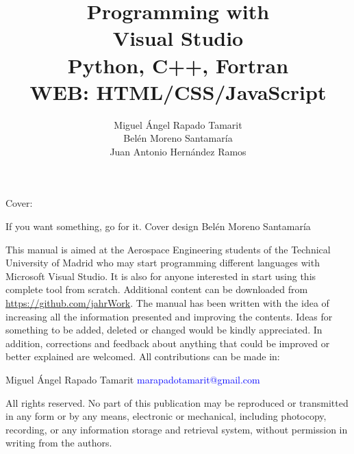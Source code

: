 \documentclass[a4paper,11pt,twoside,english]{book}
\title{{\fontsize{28}{34}\selectfont Programming with \\ \vspace{0.4cm} Visual Studio \\ \vspace{0.8cm} }  {\fontsize{28}{34}\selectfont Python, C++, Fortran\\ \vspace{0.4cm}WEB: HTML/CSS/JavaScript }}
\author{Miguel \'Angel Rapado Tamarit\\
		    Bel\'en Moreno Santamar\'ia \\
		    Juan Antonio Hern\'andez Ramos\\ 	
            \vspace{5cm} } %
\date{  } %
\begin{document}
 
  
  
  
   
    \maketitle
    \thispagestyle{empty}   %
    
    
    \noindent  Cover: 
    
    \noindent If you want something, go for it. Cover design Belén Moreno Santamaría
   
 
    \vfill  
    \begin{minipage}[b]{0.9\textwidth}
        This manual is aimed at the Aerospace Engineering students of the Technical University of Madrid who may start programming different languages with Microsoft Visual Studio. It is also for anyone interested in start using this complete tool from scratch. Additional content can be downloaded from \url{https://github.com/jahrWork}. The manual has been written with the idea of increasing all the information presented and improving the contents. Ideas for something to be added, deleted or changed would be kindly appreciated. In addition, corrections and feedback about anything that could be improved or better explained are welcomed. All contributions can be made in:
        
        \vspace*{2\baselineskip}
        Miguel Ángel Rapado Tamarit \newline
        \textcolor{Blue}{marapadotamarit@gmail.com}
        \vspace*{3\baselineskip}
        
        
    \end{minipage}
    
    \noindent
    All rights reserved.
    No part of this publication may be reproduced or transmitted in any form or by any means, electronic or mechanical, including photocopy, recording, or any information storage and retrieval system, without permission in writing from the authors. 
    \vspace{\baselineskip}
   
\end{document}
